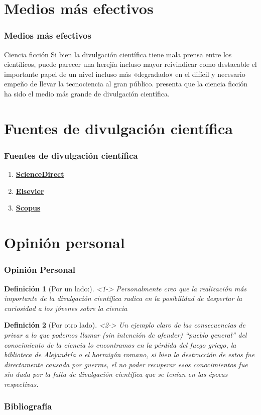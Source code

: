 \documentclass{beamer}
\newtheorem{definicion}{Definición}
\begin{document}
	\section{Medios más efectivos}
	\begin{frame}
		\frametitle{Medios más efectivos}
		\begin{block}{Ciencia ficción}
			Si bien la divulgación científica tiene mala prensa entre los científicos, puede parecer una herejía incluso mayor reivindicar como destacable el importante papel de un nivel incluso más «degradado» en el difícil y necesario empeño de llevar la tecnociencia al gran público. \cite{barcelo_ciencia_1998} presenta que la ciencia ficción ha sido el medio más grande de divulgación científica.
		\end{block}
	\end{frame}

	\section{Fuentes de divulgación científica}
	\begin{frame}
		
		\frametitle{Fuentes de divulgación científica}
		\begin{enumerate}
			\item \href{https://www.sciencedirect.com/}{\textbf{ScienceDirect}} 
			\item \href{https://www.elsevier.es/es}{\textbf{Elsevier}}
			\item \href{https://www.scopus.com/home.uri}{\textbf{Scopus}}
		\end{enumerate}
		
	\end{frame}
	
	\section{Opinión personal}
	\begin{frame}
		\frametitle{Opinión Personal}
		 \begin{definicion}[Por un lado:]<1->
		 	Personalmente creo que la realización más importante de la divulgación científica radica en la posibilidad de despertar la curiosidad a los jóvenes sobre la ciencia
		 \end{definicion}
	 	\begin{definicion}[Por otro lado]<2->
	 		Un ejemplo claro de las consecuencias de privar a lo que podemos llamar (sin intención de ofender) “pueblo general” del conocimiento de la ciencia lo encontramos en la pérdida del fuego griego, la biblioteca de Alejandría o el hormigón romano, si bien la destrucción de estos fue directamente causada por guerras, el no poder recuperar esos conocimientos fue sin duda por la falta de divulgación científica que se tenían en las épocas respectivas.
	 		
	 	\end{definicion}
		  
		 
	\end{frame}
		
	
	
	\begin{frame}[allowframebreaks]
		\frametitle{Bibliografía}
		 \setcitestyle{notesep={; },round,aysep={,},yysep={;}}
		
		
	\end{frame}

	
\end{document}
